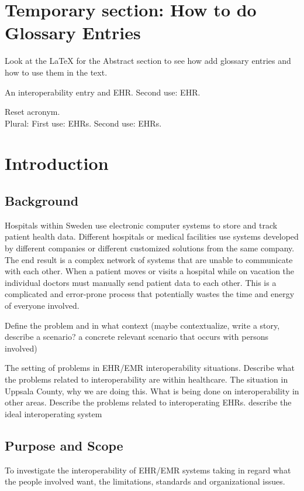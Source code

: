 \documentclass[14pt]{article}
\begin{document}
\newpage

\printglossaries

\section*{Temporary section: How to do Glossary Entries}

Look at the {\LaTeX} for the Abstract section to see how add glossary entries and how to use them in the text.

An \gls{interoperability} entry and \gls{EHR}. Second use: \gls{EHR}.

Reset acronym. \\
Plural: First use: \glspl{EHR}. Second use: \glspl{EHR}.

\newpage

\section{Introduction}
\label{sec:Introduction}

\subsection{Background}
Hospitals within Sweden use electronic computer systems to store and track patient health data. Different hospitals or medical facilities use systems developed by different companies or different customized solutions from the same company. The end result is a complex network of systems that are unable to communicate with each other. When a patient moves or visits a hospital while on vacation the individual doctors must manually send patient data to each other. This is a complicated and error-prone process that potentially wastes the time and energy of everyone involved.

Define the problem and in what context (maybe contextualize, write a story, describe a scenario? a concrete relevant scenario that occurs with persons involved)

The setting of problems in \gls{EHR}/EMR \gls{interoperability} situations. Describe what the problems related to \gls{interoperability} are within healthcare. The situation in Uppsala County, why we are doing this. What is being done on \gls{interoperability} in other areas. Describe the problems related to interoperating \glspl{EHR}.
describe the ideal interoperating system

\subsection{Purpose and Scope}
To investigate the \gls{interoperability} of
\gls{EHR}/EMR systems taking in regard what
the people involved want, the limitations,
standards and organizational issues.
\end{document}
